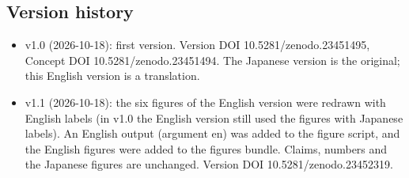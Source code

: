 \documentclass[
  a4paper,
]{article}
\providecommand{\tightlist}{%
  \setlength{\itemsep}{0pt}\setlength{\parskip}{0pt}}
\begin{document}
\subsection{Version history}\label{version-history}

\begin{itemize}
\tightlist
\item
  v1.0 (2026-10-18): first version. Version DOI 10.5281/zenodo.23451495,
  Concept DOI 10.5281/zenodo.23451494. The Japanese version is the
  original; this English version is a translation.
\item
  v1.1 (2026-10-18): the six figures of the English version were redrawn
  with English labels (in v1.0 the English version still used the
  figures with Japanese labels). An English output (argument en) was
  added to the figure script, and the English figures were added to the
  figures bundle. Claims, numbers and the Japanese figures are
  unchanged. Version DOI 10.5281/zenodo.23452319.
\end{itemize}
\end{document}
